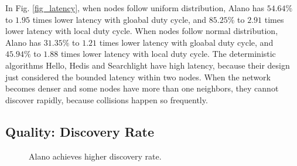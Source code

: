 In Fig. \ref{fig_latency}, when nodes follow uniform distribution, Alano has $54.64\%$ to $1.95$ times lower latency with gloabal duty cycle, and $85.25\%$ to $2.91$ times lower latency with local duty cycle. 
When nodes follow normal distribution, Alano has $31.35\%$ to $1.21$ times lower latency with gloabal duty cycle, and $45.94\%$ to $1.88$ times lower latency with local duty cycle. 
The deterministic algorithms Hello, Hedis and Searchlight have high latency, because their design just considered the bounded latency within two nodes. When the network becomes denser and some nodes have more than one neighbors, they cannot discover rapidly, because collisions happen so frequently.


\subsection{Quality: Discovery Rate}

\begin{figure}[!h]

\hspace{0.01in}
\hspace{0.01in}
\hspace{0.01in}
\caption{Alano achieves higher discovery rate.}
\label{fig_timerate}
\end{figure}


